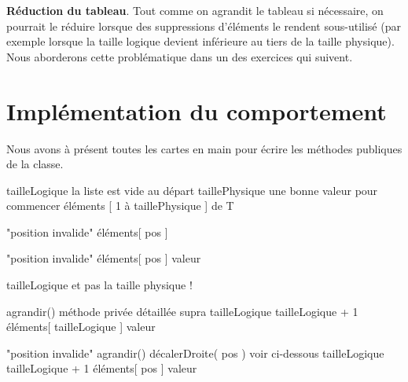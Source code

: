 \bigskip

\textbf{Réduction du tableau}. Tout comme on agrandit le tableau si
nécessaire, on pourrait le réduire lorsque des suppressions d’éléments
le rendent sous-utilisé (par exemple lorsque la taille logique devient
inférieure au tiers de la taille physique). 
Nous aborderons cette problématique dans un des exercices qui suivent.


\section{Implémentation du comportement}

Nous avons à présent toutes les cartes en main pour écrire les méthodes
publiques de la classe.

\begin{Pseudocode}
		\Let tailleLogique 
		\RComment la liste est vide au départ
		\Let taillePhysique 
		\RComment une bonne valeur pour commencer
		\Let éléments \Gets {}  [ 1 à taillePhysique ] de T
	\EndConstr
\end{Pseudocode}

\begin{Pseudocode}
			\Error "position invalide"
		\EndIf
		\Return éléments[ pos ]
	\EndMethod
\end{Pseudocode}

\begin{Pseudocode}
			\Error "position invalide"
		\EndIf
		\Let éléments[ pos ] \Gets valeur
	\EndMethod
\end{Pseudocode}

\begin{Pseudocode}
		\Return tailleLogique
		\RComment et pas la taille physique !
	\EndMethod
\end{Pseudocode}

\begin{Pseudocode}
			\Stmt agrandir()
			\RComment méthode privée détaillée supra
		\EndIf
		\Let tailleLogique \Gets tailleLogique + 1
		\Let éléments[ tailleLogique ] \Gets valeur
	\EndMethod
\end{Pseudocode}

\begin{Pseudocode}
			\Error "position invalide"
		\EndIf
			\Stmt agrandir()
		\EndIf
		\Stmt décalerDroite( pos )
		\RComment voir ci-dessous
		\Let tailleLogique \Gets tailleLogique + 1
		\Let éléments[ pos ] \Gets valeur
	\EndMethod
\end{Pseudocode}

